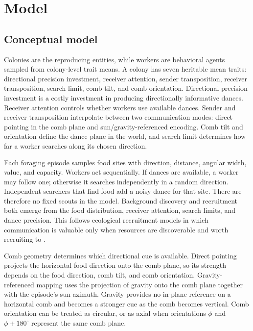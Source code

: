 \documentclass[11pt]{article}
\begin{document}
\section{Model}

\subsection{Conceptual model}

Colonies are the reproducing entities, while workers are behavioral agents
sampled from colony-level trait means. A colony has seven heritable mean traits:
directional precision investment, receiver attention, sender transposition,
receiver transposition, search limit, comb tilt, and comb orientation.
Directional precision investment is a costly investment in producing
directionally informative dances. Receiver attention controls whether workers
use available dances. Sender and receiver transposition interpolate between two
communication modes: direct pointing in the comb plane and sun/gravity-referenced
encoding. Comb tilt and orientation define the dance plane in the
world, and search limit determines how far a worker searches along its chosen
direction.

Each foraging episode samples food sites with direction, distance, angular
width, value, and capacity. Workers act sequentially. If dances are available,
a worker may follow one; otherwise it searches independently in a random
direction. Independent searchers that find food add a noisy dance for that site.
There are therefore no fixed scouts in the model. Background discovery and
recruitment both emerge from the food distribution, receiver attention, search
limits, and dance precision. This follows ecological recruitment models in
which communication is valuable only when resources are discoverable and worth
recruiting to \cite{dornhaus_etal_2006,beekman_lew_2008}.

Comb geometry determines which directional cue is available. Direct pointing
projects the horizontal food direction onto the comb plane, so its strength
depends on the food direction, comb tilt, and comb orientation. Gravity-
referenced mapping uses the projection of gravity onto the comb plane together
with the episode's sun azimuth. Gravity provides no in-plane reference on a
horizontal comb and becomes a stronger cue as the comb becomes vertical.
Comb orientation can be treated as circular, or as axial when orientations
$\phi$ and $\phi + 180^\circ$ represent the same comb plane.
\end{document}
